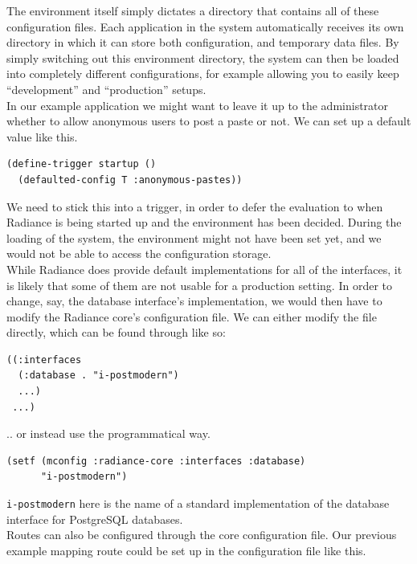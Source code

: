\documentclass{sig-alternate}
\begin{document}
The environment itself simply dictates a directory that contains all of these configuration files. Each application in the system automatically receives its own directory in which it can store both configuration, and temporary data files. By simply switching out this environment directory, the system can then be loaded into completely different configurations, for example allowing you to easily keep ``development'' and ``production'' setups. \\

In our example application we might want to leave it up to the administrator whether to allow anonymous users to post a paste or not. We can set up a default value like this.

\begin{verbatim}
(define-trigger startup ()
  (defaulted-config T :anonymous-pastes))
\end{verbatim}

We need to stick this into a trigger, in order to defer the evaluation to when Radiance is being started up and the environment has been decided. During the loading of the system, the environment might not have been set yet, and we would not be able to access the configuration storage. \\

While Radiance does provide default implementations for all of the interfaces, it is likely that some of them are not usable for a production setting. In order to change, say, the database interface's implementation, we would then have to modify the Radiance core's configuration file. We can either modify the file directly, which can be found through  like so:

\begin{verbatim}
((:interfaces
  (:database . "i-postmodern")
  ...)
 ...)
\end{verbatim}

.. or instead use the programmatical way.

\begin{verbatim}
(setf (mconfig :radiance-core :interfaces :database)
      "i-postmodern")
\end{verbatim}

\texttt{i-postmodern} here is the name of a standard implementation of the database interface for PostgreSQL databases. \\

Routes can also be configured through the core configuration file. Our previous example mapping route could be set up in the configuration file like this.
\end{document}
